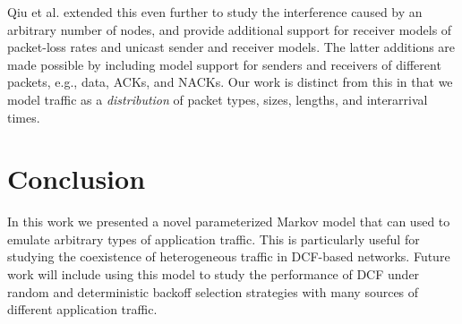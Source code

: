 \documentclass[conference]{IEEEtran}
\begin{document}
Qiu et al. \cite{qiu2007general} extended this even further to study the interference caused by an arbitrary number of nodes, and provide additional support for receiver models of packet-loss rates and unicast sender and receiver models. The latter additions are made possible by including model support for senders and receivers of different packets, e.g., data, ACKs, and NACKs. Our work is distinct from this in that we model traffic as a \emph{distribution} of packet types, sizes, lengths, and interarrival times. 

\section{Conclusion}
In this work we presented a novel parameterized Markov model that can used to emulate arbitrary types of application traffic. This is particularly useful for studying the coexistence of heterogeneous traffic in DCF-based networks. Future work will include using this model to study the performance of DCF under random and deterministic backoff selection strategies with many sources of different application traffic.




\end{document}
